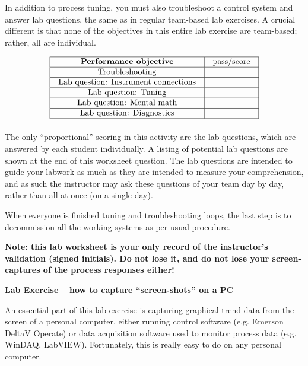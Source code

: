 \documentclass[12pt,a4paper]{article}
\begin{document}
In addition to process tuning, you must also troubleshoot a control system and answer lab questions, the same as in regular team-based lab exercises.  A crucial different is that none of the objectives in this entire lab exercise are team-based; rather, all are individual. 

\vskip 10pt



$$\vbox{\offinterlineskip
\halign{\strut
\vrule \quad\hfil # \ \hfil & 
\vrule \quad\hfil # \ \hfil \vrule \cr
\noalign{\hrule}
%
{\bf Performance objective} & pass/score \cr
%
\noalign{\hrule}
%
Troubleshooting &   \cr
%
\noalign{\hrule}
%
Lab question: Instrument connections &  \cr
%
\noalign{\hrule}
%
Lab question: Tuning &  \cr
%
\noalign{\hrule}
%
Lab question: Mental math &  \cr
%
\noalign{\hrule}
%
Lab question: Diagnostics &  \cr
%
\noalign{\hrule}
} %
}$$ %

\vskip 10pt

The only ``proportional'' scoring in this activity are the lab questions, which are answered by each student individually.  A listing of potential lab questions are shown at the end of this worksheet question.  The lab questions are intended to guide your labwork as much as they are intended to measure your comprehension, and as such the instructor may ask these questions of your team day by day, rather than all at once (on a single day).

When everyone is finished tuning and troubleshooting loops, the last step is to decommission all the working systems as per usual procedure.

\vskip 10pt

{\bf Note: this lab worksheet is your only record of the instructor's validation (signed initials).  Do not lose it, and do not lose your screen-captures of the process responses either!}





\vfil \eject

\noindent
{\bf Lab Exercise -- how to capture ``screen-shots'' on a PC}

\vskip 5pt

An essential part of this lab exercise is capturing graphical trend data from the screen of a personal computer, either running control software (e.g. Emerson DeltaV Operate) or data acquisition software used to monitor process data (e.g. WinDAQ, LabVIEW).  Fortunately, this is really easy to do on any personal computer. 
\end{document}
